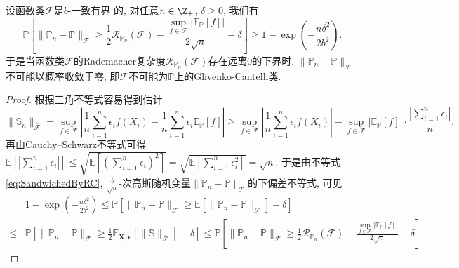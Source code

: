 \begin{proposition}\label{thm:EmpericalMeasureErrorLowerBddByRC}
	设函数类$\mathscr{F}$是$b$-一致有界	的, 对任意$n \in \Z_+$, $\delta \geq 0$, 我们有
	\begin{equation*}
		\mathbb{P} \left[ \|\mathbb{P}_n - \mathbb{P}\|_{\mathscr{F}} \geq \frac{1}{2} \mathcal{R}_{\mathbb{P}_n}(\mathscr{F}) - \frac{\sup_{f \in \mathscr{F}}\left|\mathbb{E}_{\mathbb{P}}[f]\right|}{2 \sqrt{n}} - \delta \right]
		\geq 1 - \exp \left(- \frac{n \delta^2}{2 b^2} \right). 
	\end{equation*}
	于是当函数类$\mathscr{F}$的Rademacher复杂度$\mathcal{R}_{\mathbb{P}_n}(\mathscr{F})$存在远离$0$的下界时, $\|\mathbb{P}_n - \mathbb{P}\|_{\mathscr{F}}$不可能以概率收敛于零, 即$\mathscr{F}$不可能为$\mathbb{P}$上的Glivenko-Cantelli类.
\end{proposition}
\begin{proof}
	根据三角不等式容易得到估计
	\begin{equation*}
		\|\mathbb{S}_n\|_{\bar{\mathscr{F}}}
		= \sup_{f \in \mathscr{F}} \left|\frac{1}{n} \sum_{i=1}^n \epsilon_i f(X_i) - \frac{1}{n} \sum_{i=1}^n \epsilon_i \mathbb{E}_{\mathbb{P}}[f] \right|
		\geq \sup_{f \in \mathscr{F}} \left|\frac{1}{n} \sum_{i=1}^n \epsilon_i f(X_i)\right| - \sup_{f \in \mathscr{F}} \left|\mathbb{E}_{\mathbb{P}}[f]\right| \cdot \frac{\left| \sum_{i=1}^n \epsilon_i \right|}{n}.
	\end{equation*}
	再由Cauchy–Schwarz不等式可得$\displaystyle \mathbb{E}\left[\left| \sum_{i=1}^n \epsilon_i \right|\right] \leq \sqrt{\mathbb{E}\left[ \left(\sum_{i=1}^n \epsilon_i\right)^2 \right]} = \sqrt{\mathbb{E}\left[ \sum_{i=1}^n \epsilon_i^2 \right]} = \sqrt{n}$. 
	于是由不等式\eqref{eq:SandwichedByRC}, $\frac{b}{\sqrt{n}}$-次高斯随机变量$\|\mathbb{P}_n - \mathbb{P}\|_{\mathscr{F}}$的下偏差不等式, 可见
	\begin{align*}
		& 1 - \exp \left(- \frac{n \delta^2}{2 b^2} \right) 
		\leq \mathbb{P} \left[ \|\mathbb{P}_n - \mathbb{P}\|_{\mathscr{F}} \geq \mathbb{E} \left[ \|\mathbb{P}_n - \mathbb{P}\|_{\mathscr{F}} \right] - \delta \right] \\
		\leq & \mathbb{P} \left[ \|\mathbb{P}_n - \mathbb{P}\|_{\mathscr{F}} \geq \frac{1}{2} \mathbb{E}_{\bm{X}, \bm{\epsilon}} \left[\|\mathbb{S}\|_{\bar{\mathscr{F}}}\right] - \delta \right]
		\leq  \mathbb{P} \left[ \|\mathbb{P}_n - \mathbb{P}\|_{\mathscr{F}} \geq \frac{1}{2} \mathcal{R}_{\mathbb{P}_n}(\mathscr{F}) - \frac{\sup_{f \in \mathscr{F}}\left|\mathbb{E}_{\mathbb{P}}[f]\right|}{2 \sqrt{n}} - \delta \right]
	\end{align*}
\end{proof}

